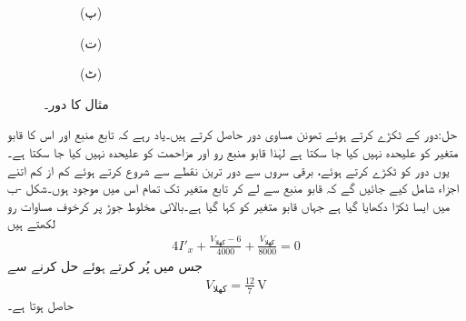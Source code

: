 \begin{figure}
\begin{subfigure}{0.6\textwidth}
\begin{tikzpicture}
\end{tikzpicture}
\caption*{(پ)}
\end{subfigure}%
\begin{subfigure}{0.4\textwidth}
\centering
{}
\caption*{(ت)}
\end{subfigure}
\begin{subfigure}{0.5\textwidth}
\centering
{}
\caption*{(ٹ)}
\end{subfigure}%
\caption{مثال  کا دور۔}
\label{شکل_مسئلہ_تابع_غیر_تابع_مثال_الف}
\end{figure}

حل:دور کے ٹکڑے کرتے ہوئے تھونن مساوی دور حاصل کرتے ہیں۔یاد رہے کہ تابع منبع  اور اس کا قابو متغیر کو علیحدہ نہیں کیا جا سکتا ہے لہٰذا قابو منبع رو اور  مزاحمت کو علیحدہ نہیں کیا جا سکتا ہے۔یوں دور کو ٹکڑے کرتے ہوئے، برقی سروں سے دور ترین نقطے سے شروع کرتے ہوئے  کم از کم اتنے اجزاء شامل کیے جائیں گے کہ قابو منبع سے لے کر تابع متغیر تک تمام اس میں موجود ہوں۔شکل -ب میں ایسا ٹکڑا دکھایا گیا ہے جہاں قابو متغیر کو  کہا گیا ہے۔بالائی  مخلوط جوڑ پر کرخوف مساوات رو لکھتے ہیں
\begin{align*}
4 I'_x+\frac{V_{\text{کھلا}}-6}{4000}+\frac{V_{\text{کھلا}}}{8000}=0
\end{align*}
جس میں  پُر کرتے ہوئے حل کرنے سے 
\begin{align*}
V_{\text{کھلا}}=\frac{12}{7} \, \si{\volt}
\end{align*}
حاصل ہوتا ہے۔

